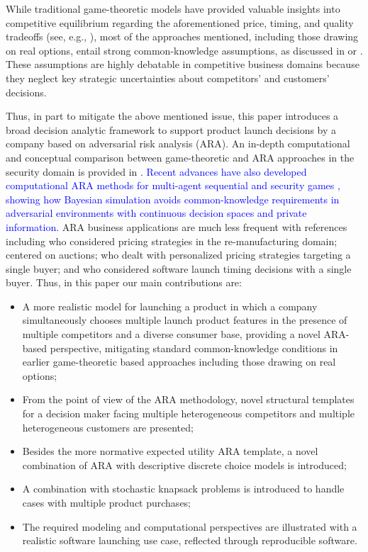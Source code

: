 \documentclass[a4paper,fleqn, 11pt]{cas-sc}
\begin{document}
 While traditional game-theoretic models have provided valuable insights into competitive equilibrium regarding the aforementioned  price, timing, and quality tradeoffs (see, e.g., \cite{dube2007competitive}), most of the approaches mentioned, 
including those drawing on real options, entail strong common-knowledge assumptions, as discussed in \cite{Hargreaves:2004} or \cite{raiffa}. These assumptions are highly debatable in competitive business domains because they neglect key strategic uncertainties about competitors' and customers' decisions.

Thus, in part to mitigate the above mentioned issue, this paper introduces a broad decision analytic framework to support product launch decisions by a company  based on adversarial risk analysis (ARA).  An in-depth computational and conceptual comparison between game-theoretic and ARA approaches in the security domain is provided in \cite{banks2022}. \textcolor{blue}{Recent advances have also developed computational ARA methods for multi-agent sequential and security games \citep{EKIN2022}, showing how Bayesian simulation avoids common-knowledge requirements in adversarial environments with continuous decision spaces and private information.}
 ARA  business applications are much less frequent with 
  references including \cite{deng2015application} who considered
 pricing strategies in the re-manufacturing domain; 
 \cite{au2021numerical} centered on auctions; 
 \cite{rasines2024personalized} who dealt with personalized pricing 
 strategies targeting a single buyer; and \cite{softearlier} 
   who considered software launch timing decisions with a single buyer. 
   Thus, in this paper
  our main contributions are:
   \begin{itemize}  
   \item A more realistic model for launching a product in which a company simultaneously chooses multiple 
   launch product features in the presence of multiple competitors and a diverse consumer base, providing a novel ARA-based perspective,  mitigating standard common-knowledge conditions  in earlier game-theoretic based approaches including those drawing on real options;
    \item  From the point of view of the ARA methodology, novel structural templates for a decision maker facing multiple heterogeneous competitors and multiple heterogeneous customers are presented;
   \item Besides the more normative expected utility ARA template, a novel combination of ARA with 
   descriptive discrete choice models is introduced;
   \item A combination with stochastic knapsack 
   problems is introduced to handle cases with multiple product purchases;
   \item The required modeling and computational perspectives are illustrated with a realistic software launching use case, reflected through reproducible software. 
  
   
   \end{itemize}
   
\end{document}

